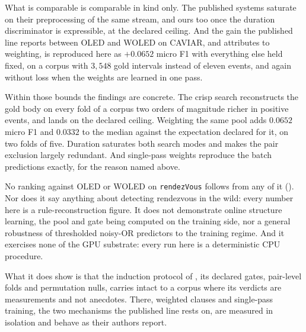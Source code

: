 What is comparable is comparable in kind only. The published systems saturate on their preprocessing of the same stream, and ours too once the duration discriminator is expressible, at the declared ceiling. And the gain the published line reports between OLED and WOLED on CAVIAR, and attributes to weighting, is reproduced here as $+0.0652$ micro F1 with everything else held fixed, on a corpus with $3{,}548$ gold intervals instead of eleven events, and again without loss when the weights are learned in one pass.

Within those bounds the findings are concrete. The crisp search reconstructs the gold body on every fold of a corpus two orders of magnitude richer in positive events, and lands on the declared ceiling. Weighting the same pool adds $0.0652$ micro F1 and $0.0332$ to the median against the expectation declared for it, on two folds of five. Duration saturates both search modes and makes the pair exclusion largely redundant. And single-pass weights reproduce the batch predictions exactly, for the reason named above.

No ranking against OLED or WOLED on \texttt{rendezVous} follows from any of it (). Nor does it say anything about detecting rendezvous in the wild: every number here is a rule-reconstruction figure. It does not demonstrate online structure learning, the pool and gate being computed on the training side, nor a general robustness of thresholded noisy-OR predictors to the training regime. And it exercises none of the GPU substrate: every run here is a deterministic CPU procedure.

What it does show is that the induction protocol of , its declared gates, pair-level folds and permutation nulls, carries intact to a corpus where its verdicts are measurements and not anecdotes. There, weighted clauses and single-pass training, the two mechanisms the published line rests on, are measured in isolation and behave as their authors report.
